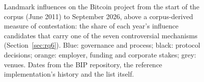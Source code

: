 \begin{figure}[t]
\caption{Landmark influences on the Bitcoin project from the start of the corpus (June 2011) to September 2026, above a corpus-derived measure of contestation: the share of each year's influence candidates that carry one of the seven controversial mechanisms (Section~\ref{sec:rq6}). Blue: governance and process; black: protocol decisions; orange: employer, funding and corporate stakes; grey: venues. Dates from the BIP repository, the reference implementation's history and the list itself.}
\label{fig:timeline}
\end{figure}
